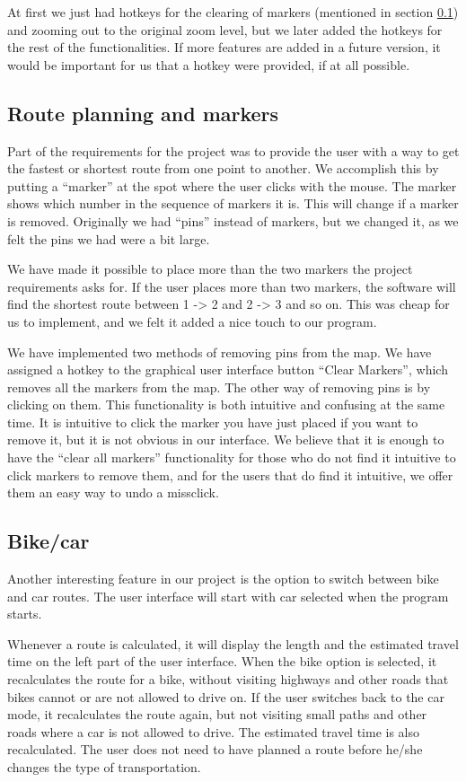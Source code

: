 At first we just had hotkeys for the clearing of markers (mentioned in section
\ref{UIA-IF-M}) and zooming out to the original zoom level, but we later added
the hotkeys for the rest of the functionalities. If more features are added in a
future version, it would be important for us that a hotkey were provided, if at
all possible.

\subsection{Route planning and markers}
\label{UIA-IF-M}
Part of the requirements for the project was to provide the user with a way to
get the fastest or shortest route from one point to another. We accomplish this
by putting a ``marker'' at the spot where the user clicks with the mouse. The
marker shows which number in the sequence of markers it is. This will change 
if a marker is removed. Originally we had ``pins'' instead of markers, but we 
changed it, as we felt the pins we had were a bit large.

We have made it possible to place more than the two markers the project
requirements asks for. If the user places more than two markers, the software
will find the shortest route between 1 -> 2 and 2 -> 3 and so on. This was cheap for
us to implement, and we felt it added a nice touch to our program. 

We have implemented two methods of removing pins from the map. We have assigned
a hotkey to the graphical user interface button ``Clear Markers'', which removes 
all the markers from the map. The other way of removing pins is by clicking on
them. This functionality is both intuitive and confusing at the same time. It is
intuitive to click the marker you have just placed if you want to remove it, but
it is not obvious in our interface. We believe that it is enough to have the
``clear all markers'' functionality for those who do not find it intuitive to
click markers to remove them, and for the users that do find it intuitive, we
offer them an easy way to undo a missclick.

\subsection{Bike/car}
\label{UIA-IF-BC}
Another interesting feature in our  project is the option
to switch between bike and car routes. The user interface will start with car
selected when the program starts.

Whenever a route is calculated, it will display the length and the estimated
travel time on the left part of the user interface. When the bike option is selected, 
it recalculates the route for a bike, without visiting highways and other roads 
that bikes cannot or are not allowed to drive on. If the user switches back to the 
car mode, it recalculates the route again, but not visiting small paths and other 
roads where a car is not allowed to drive. The estimated travel time is also 
recalculated. The user does not need to have planned a route before he/she 
changes the type of transportation.

